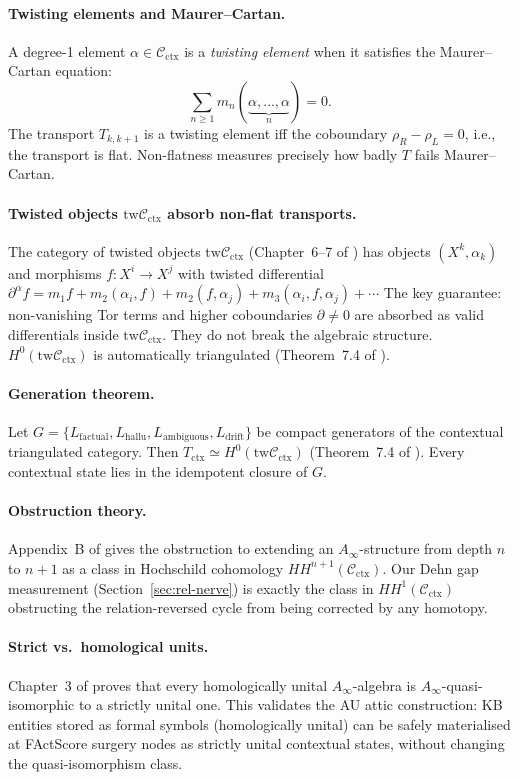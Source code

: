 \documentclass[11pt]{amsart}
\theoremstyle{definition}
\newcommand{\Cctx}{\mathcal{C}_{\!\mathrm{ctx}}}
\newcommand{\rhoR}{\rho_R}
\newcommand{\rhoL}{\rho_L}
\newcommand{\twCtx}{\mathrm{tw}\Cctx}
\begin{document}
\paragraph{Twisting elements and Maurer--Cartan.}
A degree-1 element $\alpha \in \Cctx$ is a \emph{twisting element} when it
satisfies the Maurer--Cartan equation:
\[
  \sum_{n \geq 1} m_n(\underbrace{\alpha, \ldots, \alpha}_{n}) = 0.
\]
The transport $T_{k,k+1}$ is a twisting element iff the coboundary
$\rhoR - \rhoL = 0$, i.e., the transport is flat.
Non-flatness measures precisely how badly $T$ fails Maurer--Cartan.

\paragraph{Twisted objects $\twCtx$ absorb non-flat transports.}
The category of twisted objects $\twCtx$ (Chapter~6--7 of \cite{LFH03})
has objects $(X^k, \alpha_k)$ and morphisms $f: X^i \to X^j$ with
twisted differential $\partial^\alpha f = m_1 f + m_2(\alpha_i, f) + m_2(f, \alpha_j) + m_3(\alpha_i, f, \alpha_j) + \cdots$
The key guarantee: non-vanishing Tor terms and higher coboundaries
$\partial \neq 0$ are absorbed as valid differentials inside $\twCtx$.
They do not break the algebraic structure.
$H^0(\twCtx)$ is automatically triangulated (Theorem~7.4 of \cite{LFH03}).

\paragraph{Generation theorem.}
Let $G = \{L_{\mathrm{factual}}, L_{\mathrm{hallu}}, L_{\mathrm{ambiguous}}, L_{\mathrm{drift}}\}$
be compact generators of the contextual triangulated category.
Then $T_{\mathrm{ctx}} \simeq H^0(\twCtx)$ (Theorem~7.4 of \cite{LFH03}).
Every contextual state lies in the idempotent closure of $G$.

\paragraph{Obstruction theory.}
Appendix~B of \cite{LFH03} gives the obstruction to extending an
$A_\infty$-structure from depth $n$ to $n+1$ as a class in
Hochschild cohomology $HH^{n+1}(\Cctx)$.
Our Dehn gap measurement (Section~\ref{sec:rel-nerve})
is exactly the class in $HH^1(\Cctx)$ obstructing the relation-reversed
cycle from being corrected by any homotopy.

\paragraph{Strict vs.\ homological units.}
Chapter~3 of \cite{LFH03} proves that every homologically unital
$A_\infty$-algebra is $A_\infty$-quasi-isomorphic to a strictly unital one.
This validates the AU attic construction: KB entities stored as formal
symbols (homologically unital) can be safely materialised at FActScore
surgery nodes as strictly unital contextual states, without changing
the quasi-isomorphism class.
\end{document}
